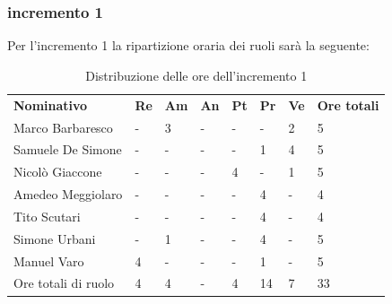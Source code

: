 \subsubsection{incremento 1}
Per l'incremento 1 la ripartizione oraria dei ruoli sarà la seguente:
\begin{center}
    \begin{table}[ht!]
        \centering
        \caption{Distribuzione delle ore dell'incremento 1}
        \vspace{5px}
        \renewcommand{\arraystretch}{1.8}
        \begin{tabular}{p{100px} p{20px} p{20px} p{20px} p{20px} p{20px} p{20px} p{50px} }
            \rowcolor{logo!70} \textbf{Nominativo} & \textbf{Re} & \textbf{Am} & \textbf{An} & \textbf{Pt} & \textbf{Pr} & \textbf{Ve} & \textbf{Ore totali} \\
            Marco Barbaresco                       & -           & 3           & -           & -           & -           & 2           & 5                   \\
            Samuele De Simone                      & -           & -           & -           & -           & 1           & 4           & 5                   \\
            Nicolò Giaccone                        & -           & -           & -           & 4           & -           & 1           & 5                   \\
            Amedeo Meggiolaro                      & -           & -           & -           & -           & 4           & -           & 4                   \\
            Tito Scutari                           & -           & -           & -           & -           & 4           & -           & 4                   \\
            Simone Urbani                          & -           & 1           & -           & -           & 4           & -           & 5                   \\
            Manuel Varo                            & 4           & -           & -           & -           & 1           & -           & 5                   \\
            Ore totali di ruolo                    & 4           & 4           & -           & 4           & 14          & 7           & 33                  \\
        \end{tabular}
    \end{table}
\end{center}
